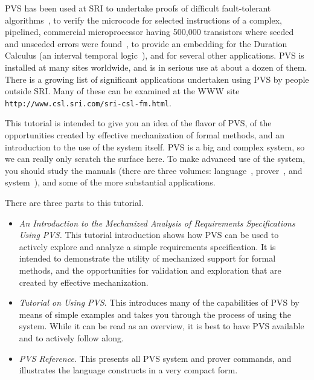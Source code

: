 \documentclass[11pt]{article}
\begin{document}
PVS has been used at SRI to undertake proofs of difficult
fault-tolerant
algorithms~\cite{Lincoln&Rushby93:CAV,Lincoln&Rushby93:FTCS,Lincoln&Rushby94:FTP},
to verify the microcode for selected instructions of a complex,
pipelined, commercial microprocessor having 500,000 transistors where
seeded and unseeded errors were found~\cite{Miller&Srivas95}, to
provide an embedding for the Duration Calculus (an interval temporal
logic~\cite{Skakkebaek&Shankar94}), and for several other
applications.  PVS is installed at many sites worldwide, and is in
serious use at about a dozen of them.  There is a growing list of
significant applications undertaken using PVS by people outside SRI.
Many of these can be examined at the WWW site {\tt
http://www.csl.sri.com/sri-csl-fm.html}.

This tutorial is intended to give you an idea of the flavor of PVS, of
the opportunities created by effective mechanization of formal
methods, and an introduction to the use of the system itself.  PVS is
a big and complex system, so we can really only scratch the surface
here.  To make advanced use of the system, you should study the
manuals (there are three volumes: language~\cite{PVS:language},
prover~\cite{PVS:prover}, and system~\cite{PVS:userguide}), and some
of the more substantial applications.

There are three parts to this tutorial.
\begin{itemize}

\item {\em An Introduction to the Mechanized Analysis of Requirements
Specifications Using PVS.} This tutorial introduction shows how PVS
can be used to actively explore and analyze a simple requirements
specification.  It is intended to demonstrate the utility of
mechanized support for formal methods, and the opportunities for
validation and exploration that are created by effective
mechanization.


\item {\em Tutorial on Using PVS}.   This introduces many of
the capabilities of PVS by means of simple examples and takes you
through the process of using the system.  While it can be read as an
overview, it is best to have PVS available and to actively follow along.

\item {\em PVS Reference}.    This presents all PVS
system and prover commands, and illustrates the language constructs
in a very compact form.

\end{itemize}
\end{document}
